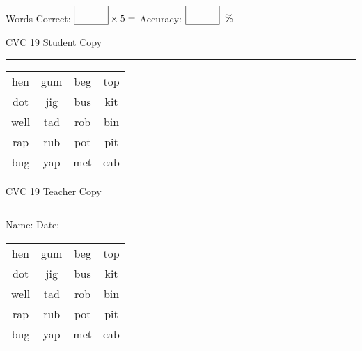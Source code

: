 \documentclass{memoir}
\begin{document}
\small

Words Correct: $\fbox{\phantom{\huge 100}} \times 5 = $ Accuracy: $\fbox{\phantom{\huge 100}}\;\; \%$ 

\vfill

\newpage


\footnotesize \noindent
CVC 19 \hfill Student Copy
\smallskip
\hrule

\Large

\setlength{\tabcolsep}{14pt}
\def\arraystretch{2}

{\selectfont


\begin{vplace}[0.5]
\begin{center}
\begin{tabular}{cccc}
hen & gum  & beg & top \\
dot & jig & bus & kit \\
well & tad & rob & bin \\
rap & rub & pot & pit \\
bug & yap & met & cab \\
\end{tabular}
\end{center}
\end{vplace}

}

\newpage

\footnotesize \noindent
CVC 19 \hfill Teacher Copy
\smallskip
\hrule

\small

\vfill

\noindent
Name: \underline{\hspace{1.75in}} \hfill Date: \underline{\hspace{1in}}

\Large

{\selectfont


\begin{vplace}[0.5]
\begin{center}
\begin{tabular}{cccc}
hen & gum  & beg & top \\
dot & jig & bus & kit \\
well & tad & rob & bin \\
rap & rub & pot & pit \\
bug & yap & met & cab \\
\end{tabular}
\end{center}
\end{vplace}



}
\end{document}
